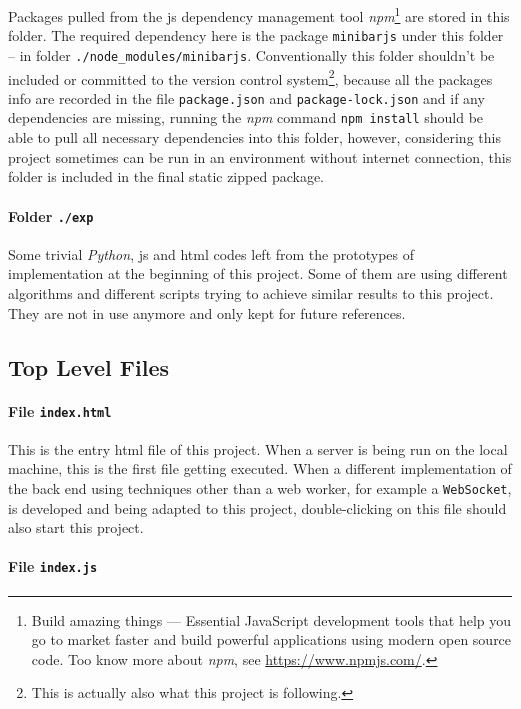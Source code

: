 Packages pulled from the \gls{js} dependency management tool \emph{npm}\footnote{ Build amazing things --- Essential JavaScript development tools that help you go to market faster and build powerful applications using modern open source code\cite{bib:npm:npm}. Too know more about \emph{npm}, see \url{https://www.npmjs.com/}.} are stored in this folder. The required dependency here is the package \texttt{minibarjs} under this folder -- in folder \texttt{./node\_modules/minibarjs}. Conventionally this folder shouldn't be included or committed to the version control system\footnote{ This is actually also what this project is following. }, because all the packages info are recorded in the file \texttt{package.json} and \texttt{package-lock.json} and if any dependencies are missing, running the \emph{npm} command \texttt{npm install} should be able to pull all necessary dependencies into this folder, however, considering this project sometimes can be run in an environment without internet connection, this folder is included in the final static zipped package.

\paragraph{Folder \texttt{./exp}}

Some trivial \emph{Python}, \gls{js} and \gls{html} codes left from the prototypes of implementation at the beginning of this project. Some of them are using different algorithms and different scripts trying to achieve similar results to this project. They are not in use anymore and only kept for future references.

\subsection{Top Level Files}

\paragraph{File \texttt{index.html}}

This is the entry \gls{html} file of this project. When a server is being run on the local machine, this is the first file getting executed. When a different implementation of the back end using techniques other than a web worker, for example a \texttt{WebSocket}, is developed and being adapted to this project, double-clicking on this file should also start this project.

\paragraph{File \texttt{index.js}}


